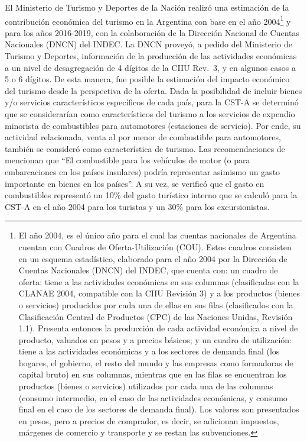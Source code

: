 \documentclass[
  openany]{book}
\begin{document}
El Ministerio de Turismo y Deportes de la Nación realizó una estimación de la contribución económica del turismo en la Argentina con base en el año 2004\footnote{El año 2004, es el único año para el cual las cuentas nacionales de Argentina cuentan con Cuadros de Oferta-Utilización (COU). Estos cuadros consisten en un esquema estadístico, elaborado para el año 2004 por la Dirección de Cuentas Nacionales (DNCN) del INDEC, que cuenta con: un cuadro de oferta: tiene a las actividades económicas en sus columnas (clasificadas con la CLANAE 2004, compatible con la CIIU Revisión 3) y a los productos (bienes o servicios) producidos por cada una de ellas en sus filas (clasificados con la Clasificación Central de Productos (CPC) de las Naciones Unidas, Revisión 1.1). Presenta entonces la producción de cada actividad económica a nivel de producto, valuados en pesos y a precios básicos; y un cuadro de utilización: tiene a las actividades económicas y a los sectores de demanda final (los hogares, el gobierno, el resto del mundo y las empresas como formadoras de capital bruto) en sus columnas, mientras que en las filas se encuentran los productos (bienes o servicios) utilizados por cada una de las columnas (consumo intermedio, en el caso de las actividades económicas, y consumo final en el caso de los sectores de demanda final). Los valores son presentados en pesos, pero a precios de comprador, es decir, se adicionan impuestos, márgenes de comercio y transporte y se restan las subvenciones.} y para los años 2016-2019, con la colaboración de la Dirección Nacional de Cuentas Nacionales (DNCN) del INDEC. La DNCN proveyó, a pedido del Ministerio de Turismo y Deportes, información de la producción de las actividades económicas a un nivel de desagregación de 4 dígitos de la CIIU Rev.~3, y en algunos casos a 5 o 6 dígitos. De esta manera, fue posible la estimación del impacto económico del turismo desde la perspectiva de la oferta. Dada la posibilidad de incluir bienes y/o servicios característicos específicos de cada país, para la CST-A se determinó que se considerarían como característicos del turismo a los servicios de expendio minorista de combustibles para automotores (estaciones de servicio). Por ende, su actividad relacionada, venta al por menor de combustible para automotores, también se consideró como característica de turismo. Las recomendaciones de \citet{riet2008} mencionan que ``El combustible para los vehículos de motor (o para embarcaciones en los países insulares) podría representar asimismo un gasto importante en bienes en los países''. A su vez, se verificó que el gasto en combustibles representó un 10\% del gasto turístico interno que se calculó para la CST-A en el año 2004 para los turistas y un 30\% para los excursionistas.
\end{document}
